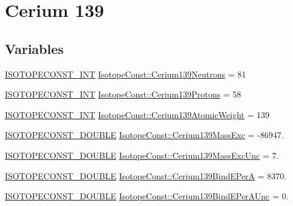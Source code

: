 \hypertarget{group___isotope_const-_cerium-_ce139}{}\section{Cerium 139}
\label{group___isotope_const-_cerium-_ce139}
\subsection*{Variables}
\begin{DoxyCompactItemize}
\item 
\mbox{\hyperlink{group___isotope_const-_macros_ga5f18360b3e99483a35c32d789e62621c}{I\+S\+O\+T\+O\+P\+E\+C\+O\+N\+S\+T\+\_\+\+I\+NT}} \mbox{\hyperlink{group___isotope_const-_cerium-_ce139_ga3fc0040b116a55f679f2bc561f2a1a43}{Isotope\+Const\+::\+Cerium139\+Neutrons}} = 81
\item 
\mbox{\hyperlink{group___isotope_const-_macros_ga5f18360b3e99483a35c32d789e62621c}{I\+S\+O\+T\+O\+P\+E\+C\+O\+N\+S\+T\+\_\+\+I\+NT}} \mbox{\hyperlink{group___isotope_const-_cerium-_ce139_ga63c27a31eb3cf260cc503360568b810b}{Isotope\+Const\+::\+Cerium139\+Protons}} = 58
\item 
\mbox{\hyperlink{group___isotope_const-_macros_ga5f18360b3e99483a35c32d789e62621c}{I\+S\+O\+T\+O\+P\+E\+C\+O\+N\+S\+T\+\_\+\+I\+NT}} \mbox{\hyperlink{group___isotope_const-_cerium-_ce139_gaded7dd77b1cec537324d91d16ef26abd}{Isotope\+Const\+::\+Cerium139\+Atomic\+Weight}} = 139
\item 
\mbox{\hyperlink{group___isotope_const-_macros_ga8f45a7272ce02c0b4c65c44636ed719a}{I\+S\+O\+T\+O\+P\+E\+C\+O\+N\+S\+T\+\_\+\+D\+O\+U\+B\+LE}} \mbox{\hyperlink{group___isotope_const-_cerium-_ce139_ga27c28be23892fb0a22372611bdd51558}{Isotope\+Const\+::\+Cerium139\+Mass\+Exc}} = -\/86947.
\item 
\mbox{\hyperlink{group___isotope_const-_macros_ga8f45a7272ce02c0b4c65c44636ed719a}{I\+S\+O\+T\+O\+P\+E\+C\+O\+N\+S\+T\+\_\+\+D\+O\+U\+B\+LE}} \mbox{\hyperlink{group___isotope_const-_cerium-_ce139_gad0c171134fdfffc737663e51281cc214}{Isotope\+Const\+::\+Cerium139\+Mass\+Exc\+Unc}} = 7.
\item 
\mbox{\hyperlink{group___isotope_const-_macros_ga8f45a7272ce02c0b4c65c44636ed719a}{I\+S\+O\+T\+O\+P\+E\+C\+O\+N\+S\+T\+\_\+\+D\+O\+U\+B\+LE}} \mbox{\hyperlink{group___isotope_const-_cerium-_ce139_gaad9898cac7289b22b82833dd35b410d4}{Isotope\+Const\+::\+Cerium139\+Bind\+E\+PerA}} = 8370.
\item 
\mbox{\hyperlink{group___isotope_const-_macros_ga8f45a7272ce02c0b4c65c44636ed719a}{I\+S\+O\+T\+O\+P\+E\+C\+O\+N\+S\+T\+\_\+\+D\+O\+U\+B\+LE}} \mbox{\hyperlink{group___isotope_const-_cerium-_ce139_gabf097ba03d21b30512d5d19dc340daf6}{Isotope\+Const\+::\+Cerium139\+Bind\+E\+Per\+A\+Unc}} = 0.

\end{DoxyCompactItemize}

